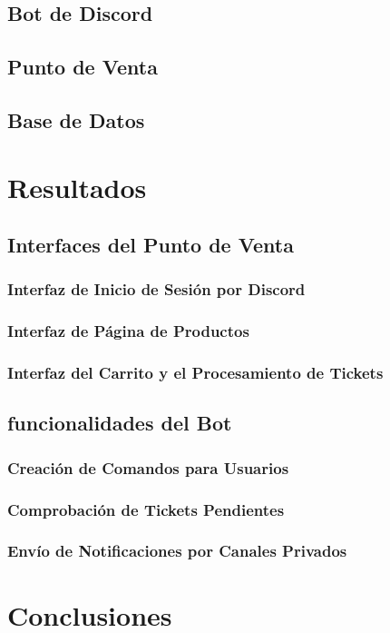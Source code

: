 \documentclass[a4paper,12pt]{article}
\begin{document}
\subsection{Bot de Discord}
\subsection{Punto de Venta}
\subsection{Base de Datos}

\section{Resultados}
\subsection{Interfaces del Punto de Venta}
\subsubsection{Interfaz de Inicio de Sesión por Discord}
\subsubsection{Interfaz de Página de Productos}
\subsubsection{Interfaz del Carrito y el Procesamiento de Tickets}

\subsection{funcionalidades del Bot}
\subsubsection{Creación de Comandos para Usuarios}
\subsubsection{Comprobación de Tickets Pendientes}
\subsubsection{Envío de Notificaciones por Canales Privados}

\section{Conclusiones}
\end{document}
